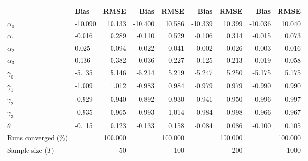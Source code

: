 
\begin{tabular}[t]{llrrrrrrr}
\toprule
  & Bias & RMSE & Bias & RMSE & Bias & RMSE & Bias & RMSE\\
\midrule
$\alpha_{0}$ & -10.090 & 10.133 & -10.400 & 10.586 & -10.339 & 10.399 & -10.036 & 10.040\\
$\alpha_{1}$ & -0.016 & 0.289 & -0.110 & 0.529 & -0.106 & 0.314 & -0.015 & 0.073\\
$\alpha_{2}$ & 0.025 & 0.094 & 0.022 & 0.041 & 0.002 & 0.026 & 0.003 & 0.016\\
$\alpha_{3}$ & 0.136 & 0.382 & 0.036 & 0.227 & -0.125 & 0.213 & -0.019 & 0.058\\
$\gamma_{0}$ & -5.135 & 5.146 & -5.214 & 5.219 & -5.247 & 5.250 & -5.175 & 5.175\\
$\gamma_{1}$ & -1.009 & 1.012 & -0.983 & 0.984 & -0.979 & 0.979 & -0.990 & 0.990\\
$\gamma_{2}$ & -0.929 & 0.940 & -0.892 & 0.930 & -0.941 & 0.950 & -0.996 & 0.997\\
$\gamma_{3}$ & -0.935 & 0.965 & -0.993 & 1.014 & -0.984 & 0.998 & -0.966 & 0.967\\
$\theta$ & -0.115 & 0.123 & -0.133 & 0.158 & -0.084 & 0.086 & -0.100 & 0.105\\
Runs converged (\%) &  & 100.000 &  & 100.000 &  & 100.000 &  & 100.000\\
Sample size ($T$) &  & 50 &  & 100 &  & 200 &  & 1000\\
\bottomrule
\end{tabular}
